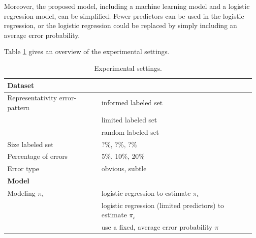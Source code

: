 \documentclass[12pt, a4paper, titlepage]{article}
\begin{document}
Moreover, the proposed model, including a machine learning model and a logistic regression model, can be simplified. Fewer predictors can be used in the logistic regression, or the logistic regression could be replaced by simply including an average error probability.


Table \ref{tab:table2} gives an overview of the experimental settings. 

\begin{table}[h]
\caption{\label{tab:table2}Experimental settings.}
\centering 
\begin{tabular}{ll}
\hline
\textbf{Dataset}               &                                                              \\ \hline
Representativity error-pattern & informed labeled set                                         \\
                               & limited labeled set                                          \\
                               & random labeled set                                           \\
Size labeled set               & ?\%, ?\%, ?\%                                                \\
Percentage of errors           & 5\%, 10\%, 20\%                                              \\
Error type                     & obvious, subtle                                              \\ \hline
\textbf{Model}                 &                                                              \\ \hline
Modeling $\pi_i$               & logistic regression to estimate $\pi_i$                      \\
                               & logistic regression (limited predictors) to estimate $\pi_i$ \\
                               & use a fixed, average error probability $\pi$                
\end{tabular}
\end{table}
\end{document}

